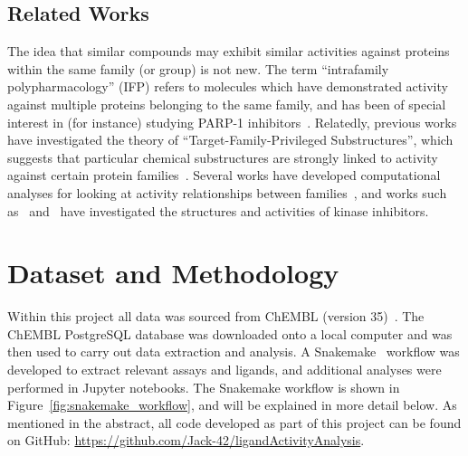 \documentclass[11pt]{article}
\begin{document}
\subsection{Related Works}
The idea that similar compounds may exhibit similar activities against proteins within the same family (or group) is not new. 
The term ``intrafamily polypharmacology'' (IFP) refers to molecules which have demonstrated activity against multiple proteins belonging to the same family, and has been of special interest in (for instance) studying PARP-1 inhibitors~\cite{passeri_camaioni_liscio_sabbatini_ferri_carotti_giacchè_pellicciari_gioiello_macchiarulo_2015, antolin_ameratunga_banerji_clarke_workman_al-lazikani_2020}. 
Relatedly, previous works have investigated the theory of ``Target-Family-Privileged Substructures'', which suggests that particular chemical substructures are strongly linked to activity against certain protein families~\cite{schnur_hermsmeier_tebben_2006}. 
Several works have developed computational analyses for looking at activity relationships between families~\cite{bajorath_2008}, and works such as~\cite{filip_miljkovic_jurgen_bajorath_2018} and~\cite{lo_liu_morrissey_kakiuchi-kiyota_johnson_broccatelli_zhong_joshi_altman_2018} have investigated the structures and activities of kinase inhibitors. 


\section{Dataset and Methodology}\label{sec:methodology}
Within this project all data was sourced from ChEMBL (version 35)~\cite{chembl_db_2023}. 
The ChEMBL PostgreSQL database was downloaded onto a local computer and was then used to carry out data extraction and analysis. 
A Snakemake~\cite{snakemake_2021} workflow was developed to extract relevant assays and ligands, and additional analyses were performed in Jupyter notebooks. 
The Snakemake workflow is shown in Figure~\ref{fig:snakemake_workflow}, and will be explained in more detail below. 
As mentioned in the abstract, all code developed as part of this project can be found on GitHub: \href{https://github.com/Jack-42/ligandActivityAnalysis}{https://github.com/Jack-42/ligandActivityAnalysis}. 
\end{document}
